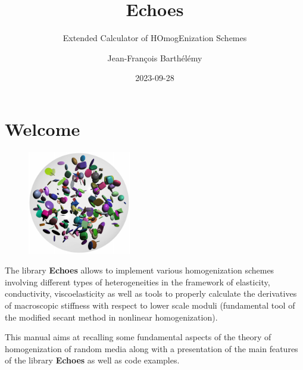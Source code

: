 \documentclass[
  letterpaper,
  DIV=11,
  numbers=noendperiod]{scrreprt}
\title{Echoes}
\subtitle{Extended Calculator of HOmogEnization Schemes}
\author{Jean-François Barthélémy}
\date{2023-09-28}
\renewcommand*\contentsname{Table of contents}
\newcommand\contentsname{Table of contents}
\begin{document}
\maketitle
\ifdefined\Shaded\renewenvironment{Shaded}{\begin{tcolorbox}[interior hidden, borderline west={3pt}{0pt}{shadecolor}, boxrule=0pt, frame hidden, enhanced, breakable, sharp corners]}{\end{tcolorbox}}\fi

\renewcommand*\contentsname{Table of contents}
{
\hypersetup{linkcolor=}
\setcounter{tocdepth}{2}
\tableofcontents
}

\hypertarget{sec-welcome}{%
\chapter*{Welcome}\label{sec-welcome}}


\begin{figure}

{\centering \includegraphics[width=0.4\textwidth,height=\textheight]{images/cover.pdf}

}

\end{figure}

The library \textbf{Echoes} allows to implement various homogenization
schemes involving different types of heterogeneities in the framework of
elasticity, conductivity, viscoelasticity as well as tools to properly
calculate the derivatives of macroscopic stiffness with respect to lower
scale moduli (fundamental tool of the modified secant method in
nonlinear homogenization).

This manual aims at recalling some fundamental aspects of the theory of
homogenization of random media along with a presentation of the main
features of the library \textbf{Echoes} as well as code examples.
\end{document}
